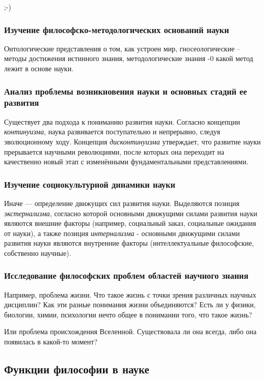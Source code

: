 ;-)

\subsubsection{Изучение философско-методологических оснований науки}

Онтологические представления о том, 
как устроен мир, гносеологические – методы достижения истинного знания, методологические 
знания -0 какой метод лежит в основе науки.
 
\subsubsection{Анализ проблемы возникновения науки и основных стадий ее развития
}
Существует два подхода к пониманию развития науки. Согласно концепции \textit{континуизма}, наука развивается поступательно и непрерывно, следуя эволюционному ходу. Концепция \textit{дисконтинуизма} утверждает, что развитие науки прерывается научными революциями, после которых она переходит на качественно новый этап с изменёнными фундаментальными представлениями.
    
\subsubsection{Изучение социокультурной динамики науки}

Иначе — определение движущих сил развития науки. Выделяются позиция \textit{экстернализма}, согласно которой основными движущими силами развития науки являются внешние факторы (например, социальный заказ, социальные ожидания от науки), а также позиция \textit{интернализма} - основными движущими силами развития науки являются внутренние факторы (интеллектуальные философские, собственно научные).
    
\subsubsection{Исследование философских проблем областей научного знания} 

Например, проблема жизни. Что такое жизнь с точки зрения различных научных дисциплин? Как эти разные понимания жизни объединяются? Есть ли у физики, биологии, химии, психологии нечто общее в понимании того, что такое жизнь? 

Или проблема происхождения Вселенной. Существовала ли она всегда, либо она появилась в какой-то момент?
        

	\subsection{Функции философии в науке} 

